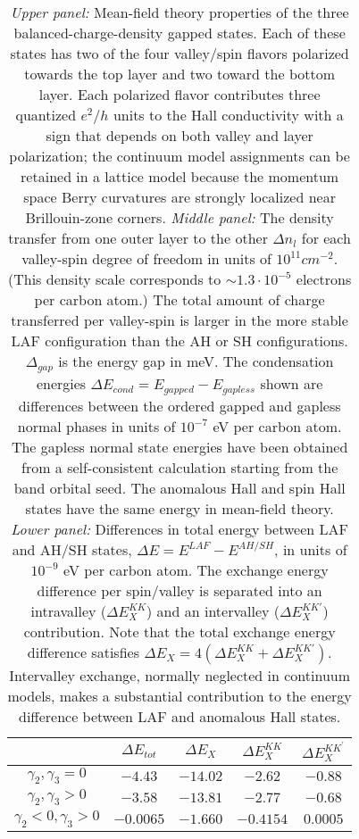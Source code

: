 \documentclass[twocolumn,prb,showpacs,preprintnumbers,amsmath,amssymb]{revtex4}
\begin{document}
\begin{table}[ht]
\begin{ruledtabular}
\begin{tabular}{|c| c c c c | }
& $\Delta E_{tot}$  & $\Delta E_{X}$ & $\Delta E_{X}^{KK}$  & $\Delta E_{X}^{K K^{\prime}}$ \\
\hline
$ \gamma_{2}, \gamma_{3}      = 0$     &   $ -4.43  $  & $-14.02 $   & $-2.62 $ & $-0.88 $     \\ %
$ \gamma_{2}, \gamma_{3} > 0 $         &   $ -3.58 $   & $ -13.81 $   & $ -2.77 $ & $ -0.68 $     \\ 
$ \gamma_{2} < 0, \gamma_{3} > 0 $   &   $ -0.0065 $   & $ -1.660 $   & $ -0.4154 $ & $ 0.0005 $   \\ 
\end{tabular} 
\end{ruledtabular}
\caption{ 
{\em Upper panel:}
Mean-field theory properties of the three balanced-charge-density gapped states.  
Each of these states has two of the four valley/spin 
flavors polarized towards the top layer and two toward the bottom layer.
Each polarized flavor contributes three 
quantized $e^2/h$ units to the Hall conductivity 
with a sign that depends on both valley and layer polarization;
the continuum model assignments can be retained in a lattice model because the 
momentum space Berry curvatures are strongly localized near Brillouin-zone corners.  
{\em Middle panel:}
The density transfer from one outer layer to the other $\Delta n_l$ for each valley-spin 
degree of freedom in units of $10^{11} cm^{-2}$.
(This density scale corresponds to $\sim 1.3 \cdot 10^{-5}$ electrons per carbon atom.)
The total amount of charge transferred per valley-spin is larger 
in the more stable LAF configuration than the AH or SH configurations.
 $\Delta_{gap}$ is the energy gap in meV.
 The condensation energies $\Delta E_{cond} = E_{gapped} - E_{gapless}$
 shown are differences between  the ordered gapped and gapless normal
 phases in units of $10^{-7}$ eV per carbon atom.
 The gapless normal state energies have been obtained from a self-consistent calculation
 starting from the band orbital seed.
 The anomalous Hall and spin Hall states have the same energy in 
mean-field theory.  
{\em Lower panel:}
Differences in total energy between LAF and AH/SH states, $\Delta E = E^{LAF} - E^{AH/SH}$, 
in units of $10^{-9}$ eV per carbon atom.  The exchange energy difference per spin/valley
is separated into an intravalley ($ \Delta E_{X}^{KK}$) and an intervalley ($ \Delta E_{X}^{KK'}$) contribution.   
Note that the total exchange energy difference satisfies  $\Delta E_X = 4 ( \Delta E_{X}^{KK} + \Delta E_{X}^{KK'} )$.
Intervalley exchange, normally neglected in continuum models,
makes a substantial contribution to the 
energy difference between LAF and anomalous Hall states.
}
\label{table:nonlin}
\end{table} 
\end{document}
